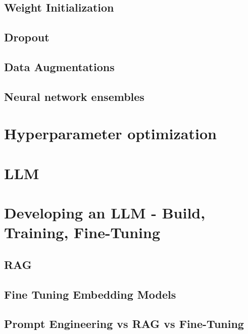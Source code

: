 \documentclass{article}
\begin{document}
\subsection{Weight Initialization}


\subsection{Dropout}


\subsection{Data Augmentations}


\subsection{Neural network ensembles}

\section{Hyperparameter optimization}


\section{LLM}
\section{Developing an LLM - Build, Training, Fine-Tuning}
\subsection{RAG}
\subsection{Fine Tuning Embedding Models}
\subsection{Prompt Engineering vs RAG vs Fine-Tuning}

\end{document}

